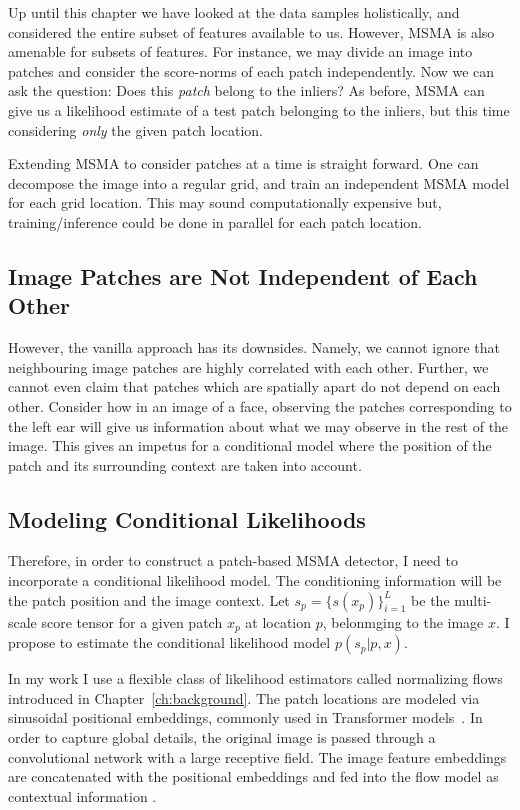 Up until this chapter we have looked at the data samples holistically, and considered the entire subset of features available to us. However, MSMA is also amenable for subsets of features. For instance, we may divide an image into patches and consider the score-norms of each patch independently. Now we can ask the question: Does this \textit{patch} belong to the inliers? As before, MSMA can give us a likelihood estimate of a test patch belonging to the inliers, but this time considering \textit{only} the given patch location.

Extending MSMA to consider patches at a time is straight forward. One can decompose the image into a regular grid, and train an independent MSMA model for each grid location. This may sound computationally expensive but, training/inference could be done in parallel for each patch location.



\subsection*{Image Patches are Not Independent of Each Other}
However, the vanilla approach has its downsides. Namely, we cannot ignore that neighbouring image patches are highly correlated with each other. Further, we cannot even claim that patches which are spatially apart do not depend on each other. Consider how in an image of a face, observing the patches corresponding to the left ear will give us information about what we may observe in the rest of the image. This gives an impetus for a conditional model where the position of the patch and its surrounding context are taken into account.

\subsection*{Modeling Conditional Likelihoods}

Therefore, in order to construct a patch-based MSMA detector, I need to incorporate a conditional likelihood model. The conditioning information will be the patch position and the image context. Let $ s_p = \{s(x_p)\}_{i=1}^{L}$ be the multi-scale score tensor for a given patch $x_p$ at location $p$, belonmging to the image $x$. I propose to estimate the conditional likelihood model $p(s_p | p, x)$. 

In my work I use a flexible class of likelihood estimators called normalizing flows introduced in Chapter~\ref{ch:background}. The patch locations are modeled via sinusoidal positional embeddings, commonly used in Transformer models~\cite{vaswani}. In order to capture global details, the original image is passed through a convolutional network with a large receptive field. The image feature embeddings are concatenated with the positional embeddings and fed into the flow model as contextual information .

